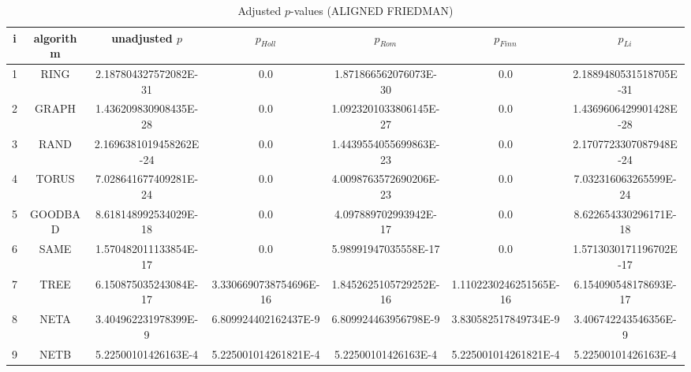 \documentclass[a4paper,10pt]{article}
\begin{document}
\begin{landscape}
\begin{table}[!htp]
\centering\scriptsize
\caption{Adjusted $p$-values (ALIGNED FRIEDMAN)}
\begin{tabular}{ccccccc}
i&algorithm&unadjusted $p$&$p_{Holl}$&$p_{Rom}$&$p_{Finn}$&$p_{Li}$\\
\hline
1& RING&2.187804327572082E-31&0.0&1.871866562076073E-30&0.0&2.1889480531518705E-31\\
2& GRAPH&1.436209830908435E-28&0.0&1.0923201033806145E-27&0.0&1.4369606429901428E-28\\
3& RAND&2.1696381019458262E-24&0.0&1.4439554055699863E-23&0.0&2.1707723307087948E-24\\
4& TORUS&7.028641677409281E-24&0.0&4.0098763572690206E-23&0.0&7.032316063265599E-24\\
5& GOODBAD&8.618148992534029E-18&0.0&4.097889702993942E-17&0.0&8.622654330296171E-18\\
6& SAME&1.570482011133854E-17&0.0&5.98991947035558E-17&0.0&1.5713030171196702E-17\\
7& TREE&6.150875035243084E-17&3.3306690738754696E-16&1.8452625105729252E-16&1.1102230246251565E-16&6.154090548178693E-17\\
8& NETA&3.404962231978399E-9&6.809924402162437E-9&6.809924463956798E-9&3.830582517849734E-9&3.406742243546356E-9\\
9& NETB&5.22500101426163E-4&5.225001014261821E-4&5.22500101426163E-4&5.225001014261821E-4&5.22500101426163E-4\\
\hline
\end{tabular}
\end{table}


\newpage


\end{landscape}
\end{document}
